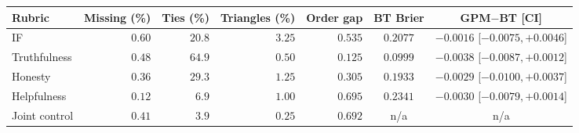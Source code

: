 \begin{tabular}{lrrrrcc}
\toprule
Rubric & Missing (\%) & Ties (\%) & Triangles (\%) & Order gap & BT Brier & GPM$-$BT [CI]\\
\midrule
IF & $0.60$ & $20.8$ & $3.25$ & $0.535$ & $0.2077$ & $-0.0016$ [$-0.0075,+0.0046$]\\
Truthfulness & $0.48$ & $64.9$ & $0.50$ & $0.125$ & $0.0999$ & $-0.0038$ [$-0.0087,+0.0012$]\\
Honesty & $0.36$ & $29.3$ & $1.25$ & $0.305$ & $0.1933$ & $-0.0029$ [$-0.0100,+0.0037$]\\
Helpfulness & $0.12$ & $6.9$ & $1.00$ & $0.695$ & $0.2341$ & $-0.0030$ [$-0.0079,+0.0014$]\\
Joint control & $0.41$ & $3.9$ & $0.25$ & $0.692$ & n/a & n/a\\
\bottomrule
\end{tabular}
